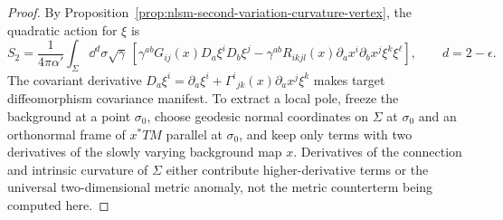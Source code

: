 \begin{proof}
By Proposition~\ref{prop:nlsm-second-variation-curvature-vertex}, the
quadratic action for \(\xi\) is
\[
  S_2
  =
  \frac1{4\pi\alpha'}
  \int_\Sigma\dd^d\sigma\sqrt\gamma\,
  \left[
    \gamma^{ab}G_{ij}(x)D_a\xi^iD_b\xi^j
    -
    \gamma^{ab}R_{ikjl}(x)
    \partial_ax^i\partial_bx^j\xi^k\xi^\ell
  \right],
  \qquad d=2-\epsilon .
\]
The covariant derivative \(D_a\xi^i=\partial_a\xi^i+
\Gamma^i{}_{jk}(x)\partial_ax^j\xi^k\) makes target diffeomorphism covariance
manifest.  To extract a local pole, freeze the background at a point
\(\sigma_0\), choose geodesic normal coordinates on \(\Sigma\) at
\(\sigma_0\) and an orthonormal frame of \(x^*TM\) parallel at
\(\sigma_0\), and keep only terms with two derivatives of the slowly varying
background map \(x\).  Derivatives of the connection and intrinsic curvature
of \(\Sigma\) either contribute higher-derivative terms or the universal
two-dimensional metric anomaly, not the metric counterterm being computed here.


\end{proof}
